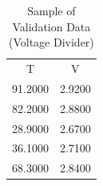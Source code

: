 \begin{table}[H]
\centering
\caption{Sample of Validation Data (Voltage Divider)}
\label{table:voltage_divider_validation_table}
\begin{tabular}{cc}

      T &      V \\

91.2000 & 2.9200 \\
82.2000 & 2.8800 \\
28.9000 & 2.6700 \\
36.1000 & 2.7100 \\
68.3000 & 2.8400 \\

\end{tabular}
\end{table}
